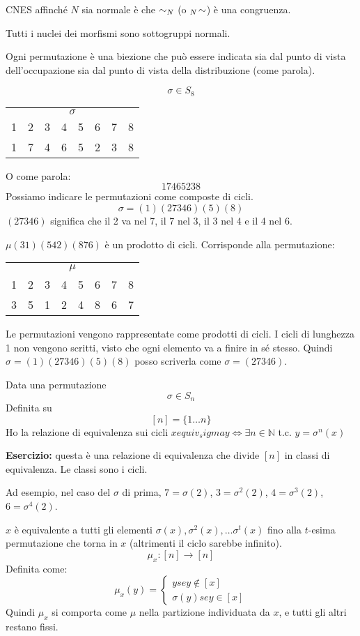 CNES affinch\'e $N$ sia normale \`e che $\sim_{N}$ (o ${}_{N}\!\sim$) \`e una congruenza.

Tutti i nuclei dei morfismi sono sottogruppi normali.

Ogni permutazione \`e una biezione che pu\`o essere indicata sia dal punto di vista dell'occupazione sia dal punto di vista della distribuzione (come parola).

\[
\sigma \in S_8
\]

\begin{tabular}{*{8}{c}}
\multicolumn{8}{c}{$\sigma$} \\
1 & 2 & 3 & 4 & 5 & 6 & 7 & 8 \\
1 & 7 & 4 & 6 & 5 & 2 & 3 & 8
\end{tabular}

O come parola:
\[
17465238
\]
Possiamo indicare le permutazioni come composte di cicli.
\[
\sigma = (1) (2 7 3 4 6) (5) (8)
\]
$(2 7 3 4 6)$ significa che il 2 va nel 7, il 7 nel 3, il 3 nel 4 e il 4 nel 6.

$\mu (3 1) (5 4 2) (8 7 6)$ \`e un prodotto di cicli. Corrisponde alla permutazione:

\begin{tabular}{*{8}{c}}
\multicolumn{8}{c}{$\mu$} \\
1 & 2 & 3 & 4 & 5 & 6 & 7 & 8 \\
3 & 5 & 1 & 2 & 4 & 8 & 6 & 7
\end{tabular}

Le permutazioni vengono rappresentate come prodotti di cicli. I cicli di lunghezza 1 non vengono scritti, visto che ogni elemento va a finire in s\'e stesso. Quindi $\sigma = (1) (2 7 3 4 6) (5) (8)$ posso scriverla come $\sigma = (2 7 3 4 6)$.

Data una permutazione
\[
\sigma \in S_n 
\]
Definita su
\[
[n] = \{1 \dots n\}
\]
Ho la relazione di equivalenza sui cicli
$x equiv_sigma y \Leftrightarrow \exists n \in \mathbb{N} $ t.c. $ y = \sigma^{n} (x)$

\textbf{Esercizio:} questa \`e una relazione di equivalenza che divide $[n]$ in classi di equivalenza. Le classi sono i cicli.

Ad esempio, nel caso del $\sigma$ di prima, $7 = \sigma(2)$, $3 = \sigma^{2}(2)$, $4 = \sigma^{3} (2)$, $6 = \sigma^{4} (2)$.

$x$ \`e equivalente a tutti gli elementi $\sigma (x), \sigma^{2} (x), \dots \sigma^{t}(x)$ fino alla $t$-esima permutazione che torna in $x$ (altrimenti il ciclo sarebbe infinito).
\[
\mu_x : [n] \to [n]
\]
Definita come:
\[
\mu_x (y) =
\begin{cases}
y se y \notin [x] \\
\sigma(y) se y \in [x]
\end{cases}
\]
Quindi $\mu_x$ si comporta come $\mu$ nella partizione individuata da $x$, e tutti gli altri restano fissi.

